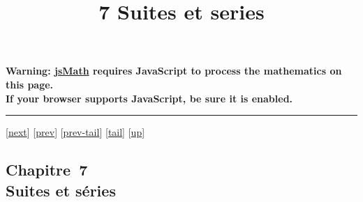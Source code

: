 \documentclass[]{article}
\title{7 Suites et series}
\author{}
\date{}
\begin{document}
\maketitle

\textbf{Warning: \href{http://www.math.union.edu/locate/jsMath}{jsMath}
requires JavaScript to process the mathematics on this page.\\ If your
browser supports JavaScript, be sure it is enabled.}

\begin{center}\rule{3in}{0.4pt}\end{center}

{[}\href{coursch9.html}{next}{]} {[}\href{coursch7.html}{prev}{]}
{[}\href{coursch7.html\#tailcoursch7.html}{prev-tail}{]}
{[}\hyperref[tailcoursch8.html]{tail}{]}
{[}\href{cours.html\#coursch8.html}{up}{]}

\subsection{Chapitre~7\\Suites et séries}
\end{document}
